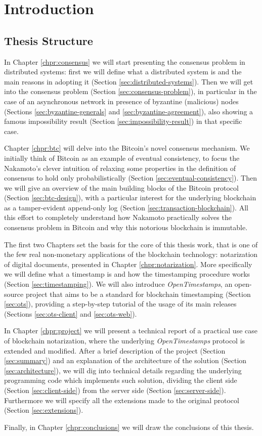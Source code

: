 \chapter{Introduction}
\label{chpr:intro}


\section{Thesis Structure}
In Chapter \ref{chpr:consensus} we will start presenting the consensus problem in distributed systems: first we will define what a distributed system is and the main reasons in adopting it (Section \ref{sec:distributed-systems}). Then we will get into the consensus problem (Section \ref{sec:consensus-problem}), in particular in the case of an asynchronous network in presence of byzantine (malicious) nodes (Sections \ref{sec:byzantine-generals} and \ref{sec:byzantine-agreement}), also showing a famous impossibility result (Section \ref{sec:impossibility-result}) in that specific case.

\bigskip
\noindent
Chapter \ref{chpr:btc} will delve into the Bitcoin's novel consensus mechanism. We initially think of Bitcoin as an example of eventual consistency, to focus the Nakamoto's clever intuition of relaxing some properties in the definition of consensus to hold only probabilistically (Section \ref{sec:eventual-consistency}). Then we will give an overview of the main building blocks of the Bitcoin protocol (Section \ref{sec:btc-design}), with a particular interest for the underlying blockchain as a tamper-evident append-only log (Section \ref{sec:transaction-blockchain}). All this effort to completely understand how Nakamoto practically solves the consensus problem in Bitcoin and why this notorious blockchain is immutable.

\bigskip
\noindent
The first two Chapters set the basis for the core of this thesis work, that is one of the few real non-monetary applications of the blockchain technology: notarization of digital documents, presented in Chapter \ref{chpr:notarization}. More specifically we will define what a timestamp is and how the timestamping procedure works (Section \ref{sec:timestamping}). We will also introduce \textit{OpenTimestamps}, an open-source project that aims to be a standard for blockchain timestamping (Section \ref{sec:ots}), providing a step-by-step tutorial of the usage of its main releases (Sections \ref{sec:ots-client} and \ref{sec:ots-web}).

\bigskip
\noindent
In Chapter \ref{chpr:project} we will present a technical report of a practical use case of blockchain notarization, where the underlying \textit{OpenTimestamps} protocol is extended and modified. After a brief description of the project (Section \ref{sec:summary}) and an explanation of the architecture of the solution (Section \ref{sec:architecture}), we will dig into technical details regarding the underlying programming code which implements such solution, dividing the client side (Section \ref{sec:client-side}) from the server side (Section \ref{sec:server-side}). Furthermore we will specify all the extensions made to the original protocol (Section \ref{sec:extensions}).

\bigskip
\noindent
Finally, in Chapter \ref{chpr:conclusions} we will draw the conclusions of this thesis.